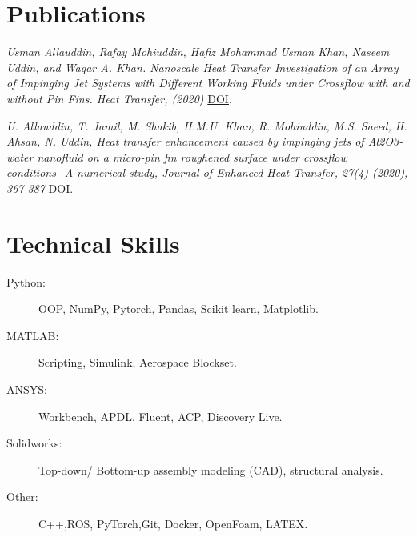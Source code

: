 \documentclass[margin, 10pt]{res} %
\begin{document}
\begin{resume}
 

\section{Publications \\}
\begin{list}

    {\sl Usman Allauddin, Rafay Mohiuddin, Hafiz Mohammad Usman Khan, Naseem Uddin, and Waqar A. Khan. Nanoscale Heat Transfer Investigation of an Array of Impinging Jet Systems with Different Working Fluids under Crossflow with and without Pin Fins. Heat Transfer, (2020)} \href{https://doi.org/10.1002/htj.21986}{DOI}.\

    {\sl U. Allauddin, T. Jamil, M. Shakib, H.M.U. Khan, R. Mohiuddin, M.S. Saeed, H. Ahsan, N. Uddin, Heat transfer enhancement caused by impinging jets of Al2O3-water nanofluid on a micro-pin fin roughened surface under crossflow conditions−A numerical study, Journal of Enhanced Heat Transfer, 27(4) (2020), 367-387} \href{https://www.dl.begellhouse.com/references/4c8f5faa331b09ea,212bf76947bffc03,5aa059fb1b898ef8.html}{DOI}.

\end{list}



 

\section{Technical Skills}      
    \begin{description}
				\item[Python:] OOP, NumPy, Pytorch, Pandas, Scikit learn, Matplotlib.
				\item[MATLAB:] Scripting, Simulink, Aerospace Blockset.
				\item[ANSYS:] Workbench, APDL, Fluent, ACP, Discovery Live. 
				\item[Solidworks:] Top-down/ Bottom-up assembly modeling (CAD), structural analysis.
				\item[Other: ] C++,ROS, PyTorch,Git, Docker, OpenFoam, LATEX.
    \end{description}



\end{resume}
\end{document}
